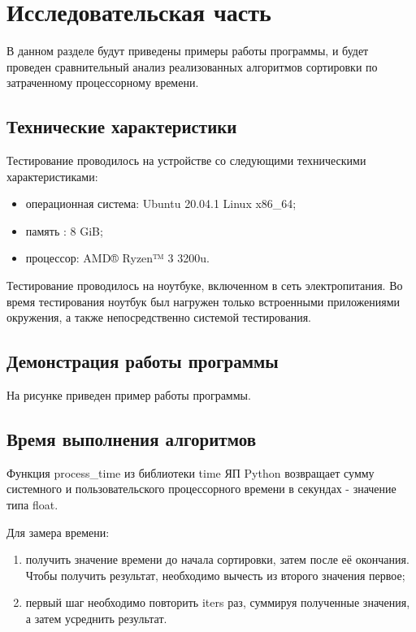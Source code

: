 \chapter{Исследовательская часть}

В данном разделе будут приведены примеры работы программы, и будет проведен сравнительный анализ реализованных алгоритмов сортировки по затраченному процессорному времени.

\section{Технические характеристики}

Тестирование проводилось на устройстве со следующими техническими характеристиками:

\begin{itemize}
	\item операционная система: Ubuntu 20.04.1 Linux x86\_64;
	\item память : 8 GiB;
	\item процессор: AMD® Ryzen™ 3 3200u.
\end{itemize}

Тестирование проводилось на ноутбуке, включенном в сеть электропитания. Во время тестирования ноутбук был нагружен только встроенными приложениями окружения, а также непосредственно системой тестирования.

\section{Демонстрация работы программы}

На рисунке приведен пример работы программы.

\section{Время выполнения алгоритмов}

Функция process\_time из библиотеки time ЯП Python возвращает сумму системного и пользовательского процессорного времени в секундах - значение типа float.

Для замера времени:
\begin{enumerate}
	\item получить значение времени до начала сортировки, затем после её окончания. Чтобы получить результат, необходимо вычесть из второго значения первое;
	\item первый шаг необходимо повторить iters раз, суммируя полученные значения, а затем усреднить результат.
\end{enumerate}

